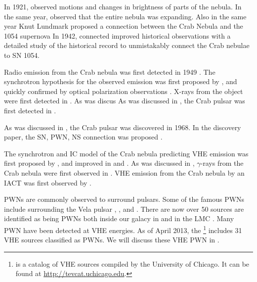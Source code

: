 In 1921, \cite{lampland_1921a_observed-changes} 
observed motions and changes in brightness of parts of the nebula.
In the same year, \cite{duncan_1921a_changes-observed} observed
that the entire nebula was expanding. Also in the same year
Knut Lundmark proposed a connection between the Crab Nebula
and the 1054 supernova \citep{lundmark_1921a_suspected-stars}
In 1942, \cite{mayall_1942a_further-bearing} connected improved
historical observations with a detailed study of the historical record
to unmistakably connect the Crab nebulae to SN 1054.

Radio emission from the Crab nebula was first detected
in 1949 \citep{bolton_1949a_positions-three}.  The
synchrotron hypothesis for the observed emission was
first proposed by \cite{shklovskii_1953a_nature-nebulas},
and quickly confirmed by optical polarization observations
\citep{dombrovsky_1954a_nature-radiation}.  X-rays from the object were
first detected in \cite{bowyer_1964a_lunar-occultation}.  As was discus
As was discussed in , the Crab pulsar
was first detected in \cite{browning_1971_detection-pulsed}.

As was discussed in , the Crab pulsar
was discovered in 1968.  In the discovery paper, the \ac{SN}, \ac{PWN},
\ac{NS} connection was proposed \citep{staelin_1968_pulsating-radio}.

The synchrotron and \ac{IC} model of the Crab nebula predicting \ac{VHE}
emission was first proposed by \cite{gould_1965a_energy-cosmic},
and improved in \cite{rieke_1969a_production-cosmic} and
\cite{grindlay_1971a_compton-synchrotron-spectrum}.  As was discussed
in , $\gamma$-rays from the Crab
nebula were first observed in \cite{nolan_1993a_observations-pulsar}.
\ac{VHE} emission from the Crab nebula by an \ac{IACT} was first observed
by \cite{weekes_1989a_observation-gamma}.

\acp{PWN} are commonly observed to surround pulsars.
Some of the famous \acp{PWN} include \velax surrounding the Vela
pulsar \citep[first observed in][]{rishbeth_1958a_radio-emission},
\threecfiftyeight \citep{slane_2004a_constraints-structure},
and \mshfifteenfiftytwo \citep{seward_1982a_x-ray-pulsar}.
There are now over 50 sources are identified as being \acp{PWN}
both inside our galacy in and in the \ac{LMC}
\cite{kaspi_2006_isolated-neutron}.
Many \ac{PWN} have been detected at \ac{VHE} energies.
As of April 2013, the \tevcat\footnote{\tevcat 
is a catalog of \ac{VHE} sources compiled by the University of
Chicago. It can be found at \url{http://tevcat.uchicago.edu}.} 
includes 31 \ac{VHE} sources classified as \acp{PWN}.
We will discuss these \ac{VHE} \ac{PWN} in .
